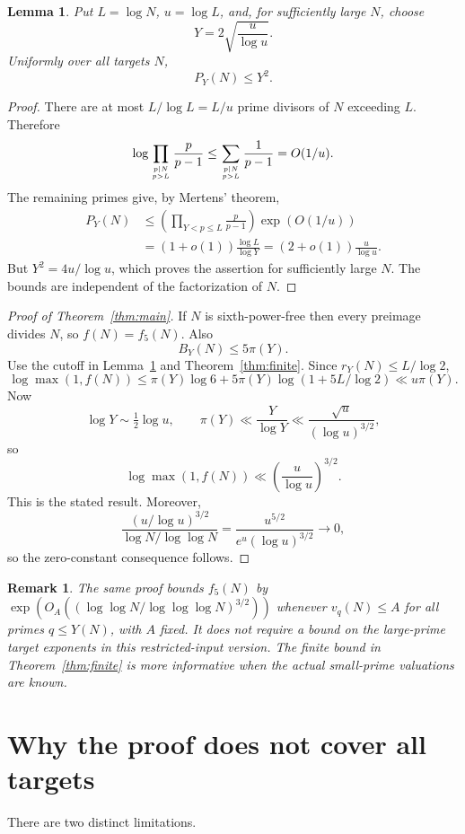 \documentclass[11pt]{article}
\newtheorem{lemma}[theorem]{Lemma}
\newtheorem{remark}[theorem]{Remark}
\begin{document}
\begin{lemma}\label{lem:cutoff}
Put $L=\log N$, $u=\log L$, and, for sufficiently large $N$, choose
\[
 Y=2\sqrt{\frac{u}{\log u}}.
\]
Uniformly over all targets $N$,
\[
 P_Y(N)\le Y^2.
\]
\end{lemma}
\begin{proof}
There are at most $L/\log L=L/u$ prime divisors of $N$ exceeding $L$. Therefore
\[
 \log\prod_{p\mid N\atop p>L}\frac{p}{p-1}
 \le\sum_{p\mid N\atop p>L}\frac{1}{p-1}
 =O(1/u).
\]
The remaining primes give, by Mertens' theorem,
\[
 \begin{split}
 P_Y(N)
 &\le \left(\prod_{Y<p\le L}\frac{p}{p-1}\right)\exp(O(1/u))\\
 &=(1+o(1))\frac{\log L}{\log Y}
 =(2+o(1))\frac{u}{\log u}.
 \end{split}
\]
But $Y^2=4u/\log u$, which proves the assertion for sufficiently large $N$. The bounds are independent of the factorization of $N$.
\end{proof}

\begin{proof}[Proof of Theorem~\ref{thm:main}]
If $N$ is sixth-power-free then every preimage divides $N$, so $f(N)=f_5(N)$. Also
\[
 B_Y(N)\le5\pi(Y).
\]
Use the cutoff in Lemma~\ref{lem:cutoff} and Theorem~\ref{thm:finite}. Since $r_Y(N)\le L/\log2$,
\[
 \log\max(1,f(N))
 \le\pi(Y)\log6+5\pi(Y)\log(1+5L/\log2)
 \ll u\pi(Y).
\]
Now
\[
 \log Y\sim\tfrac12\log u,
 \qquad
 \pi(Y)\ll\frac{Y}{\log Y}
 \ll\frac{\sqrt u}{(\log u)^{3/2}},
\]
so
\[
 \log\max(1,f(N))\ll\left(\frac{u}{\log u}\right)^{3/2}.
\]
This is the stated result. Moreover,
\[
 \frac{(u/\log u)^{3/2}}{\log N/\log\log N}
 =\frac{u^{5/2}}{e^u(\log u)^{3/2}}\longrightarrow0,
\]
so the zero-constant consequence follows.
\end{proof}

\begin{remark}
The same proof bounds $f_5(N)$ by
$\exp(O_A((\log\log N/\log\log\log N)^{3/2}))$
whenever $v_q(N)\le A$ for all primes $q\le Y(N)$, with $A$ fixed. It does not require a bound on the large-prime target exponents in this restricted-input version. The finite bound in Theorem~\ref{thm:finite} is more informative when the actual small-prime valuations are known.
\end{remark}

\section{Why the proof does not cover all targets}
There are two distinct limitations.
\end{document}
